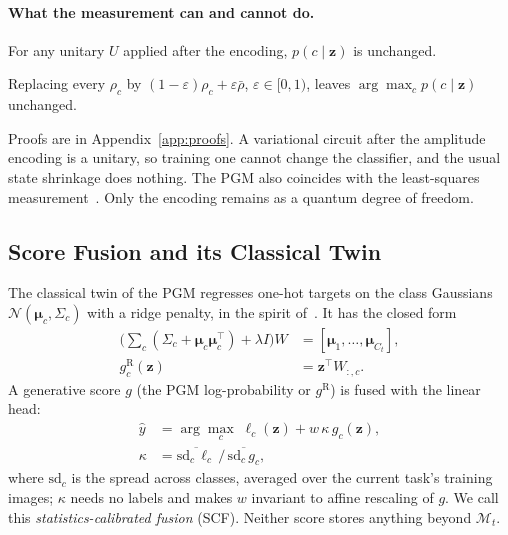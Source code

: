 \paragraph{What the measurement can and cannot do.}
\begin{proposition}\label{prop:unitary}
For any unitary $U$ applied after the encoding, $p(c\mid\mathbf z)$ is unchanged.
\end{proposition}
\begin{proposition}\label{prop:shrink}
Replacing every $\rho_c$ by $(1-\varepsilon)\rho_c+\varepsilon\bar\rho$,
$\varepsilon\in[0,1)$, leaves $\arg\max_cp(c\mid\mathbf z)$ unchanged.
\end{proposition}
\noindent Proofs are in Appendix~\ref{app:proofs}. A variational circuit after
the amplitude encoding is a unitary, so training one cannot change the
classifier, and the usual state shrinkage does nothing. The PGM also coincides
with the least-squares measurement~\citep{eldar2001srm}. Only the encoding
remains as a quantum degree of freedom.

\subsection{Score Fusion and its Classical Twin}
\label{sec:fusion}
The classical twin of the PGM regresses one-hot targets on the class Gaussians
$\mathcal N(\boldsymbol\mu_c,\Sigma_c)$ with a ridge penalty, in the spirit
of~\citet{mcdonnell2023ranpac}. It has the closed form
\begin{equation}
  \begin{aligned}
  \Big(\sum_{c}(\Sigma_c+\boldsymbol\mu_c\boldsymbol\mu_c^{\top})+\lambda I\Big)W
  &=[\boldsymbol\mu_1,\dots,\boldsymbol\mu_{C_t}],\\
  g^{\mathrm R}_c(\mathbf z)&=\mathbf z^{\top}W_{:,c}.
  \end{aligned}
  \label{eq:ridge}
\end{equation}
A generative score $g$ (the PGM log-probability or $g^{\mathrm R}$) is fused
with the linear head:
\begin{equation}
  \begin{aligned}
  \hat y&=\arg\max_c\;\ell_c(\mathbf z)+w\,\kappa\,g_c(\mathbf z),\\
  \kappa&=\overline{\mathrm{sd}_c\,\ell_c}\,\big/\,\overline{\mathrm{sd}_c\,g_c},
  \end{aligned}
  \label{eq:fusion}
\end{equation}
where $\mathrm{sd}_c$ is the spread across classes, averaged over the current
task's training images; $\kappa$ needs no labels and makes $w$ invariant to
affine rescaling of $g$. We call this \emph{statistics-calibrated fusion}
(SCF). Neither score stores anything beyond $\mathcal M_t$.
